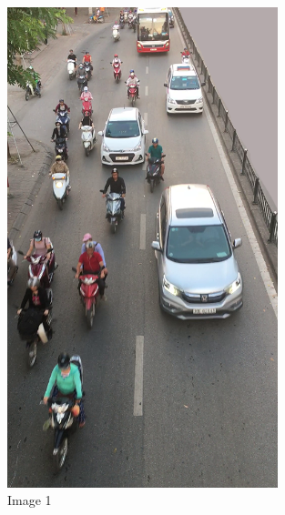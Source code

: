 \begin{center}
    \begin{figure}[H]
        \centering
      \includegraphics[width=0.7\textwidth]{Chapters/Fig/09}
      \caption{Image 1}
      \label{fig:img09}
  \end{figure}
\end{center}

